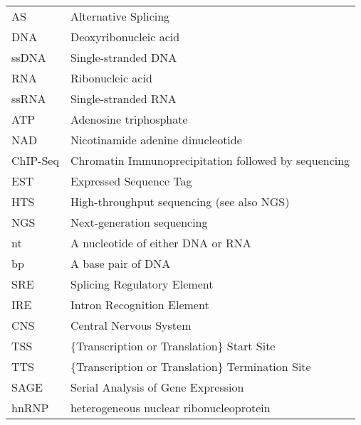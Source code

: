 \clearpage %
\listAbreviations
\begin{table}[h]
\label{hd:abrevs} 
\begin{tabular}{l|l}
AS       & Alternative Splicing                                 \\
DNA      & Deoxyribonucleic acid                                \\
ssDNA    & Single-stranded DNA                                  \\
RNA      & Ribonucleic acid                                     \\
ssRNA    & Single-stranded RNA                                  \\
ATP      & Adenosine triphosphate                               \\
NAD      & Nicotinamide adenine dinucleotide                    \\
ChIP-Seq & Chromatin Immunoprecipitation followed by sequencing \\
EST      & Expressed Sequence Tag								\\
HTS      & High-throughput sequencing (see also NGS)            \\
NGS      & Next-generation sequencing                           \\
nt       & A nucleotide of either DNA or RNA                    \\
bp       & A base pair of DNA                                   \\
SRE      & Splicing Regulatory Element                          \\
IRE      & Intron Recognition Element                           \\
CNS      & Central Nervous System                               \\
TSS      & \{Transcription or Translation\} Start Site          \\
TTS      & \{Transcription or Translation\} Termination Site    \\
SAGE     & Serial Analysis of Gene Expression                   \\
hnRNP    & heterogeneous nuclear ribonucleoprotein              \\
\end{tabular}
\end{table}